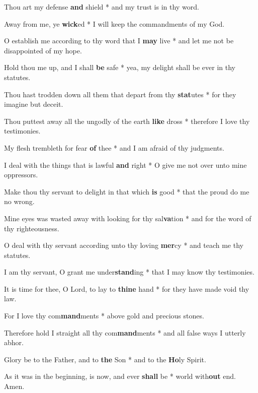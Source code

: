 \begin{multicols}{2}
	Thou art my defense \textbf{and} shield * and my trust is in thy word.
	
	Away from me, ye \textbf{wick}ed * I will keep the commandments of my God.
	
	O establish me according to thy word that I \textbf{may} live * and let me not be disappointed of my hope.
	
	Hold thou me up, and I shall \textbf{be} safe * yea, my delight shall be ever in thy statutes.
	
	Thou hast trodden down all them that depart from thy \textbf{stat}utes * for they imagine but deceit.
	
	Thou puttest away all the ungodly of the earth \textbf{like} dross * therefore I love thy testimonies.
	
	My flesh trembleth for fear \textbf{of} thee * and I am afraid of thy judgments.
	
	I deal with the things that is lawful \textbf{and} right * O give me not over unto mine oppressors.
	
	Make thou thy servant to delight in that which \textbf{is} good * that the proud do me no wrong.
	
	Mine eyes was wasted away with looking for thy sal\textbf{va}tion * and for the word of thy righteousness.
	
	O deal with thy servant according unto thy loving \textbf{mer}cy * and teach me thy statutes.
	
	I am thy servant, O grant me under\textbf{stand}ing * that I may know thy testimonies.
	
	It is time for thee, O Lord, to lay to \textbf{thine} hand * for they have made void thy law.
	
	For I love thy com\textbf{mand}ments * above gold and precious stones.
	
	Therefore hold I straight all thy com\textbf{mand}ments * and all false ways I utterly abhor. 
	
	Glory be to the Father, and to \textbf{the} Son * and to the \textbf{Ho}ly Spirit.
	
	As it was in the beginning, is now, and ever \textbf{shall} be * world with\textbf{out} end. Amen.
\end{multicols}